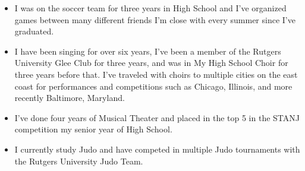 \documentclass[12pt,a4paper,sans]{moderncv}        %
\begin{document}
\begin{itemize}

\item{I was on the soccer team for three years in High School and I've organized games between many different friends I'm close with every summer since I've graduated.}

\vspace{6pt}

\item{I have been singing for over six years, I've been a member of the Rutgers University Glee Club for three years, and was in My High School Choir for three years before that. I've traveled with choirs to multiple cities on the east coast for performances and competitions such as Chicago, Illinois, and more recently Baltimore, Maryland.} 

\vspace{6pt}

\item{I've done four years of Musical Theater and placed in the top 5 in the STANJ competition my senior year of High School.}

\vspace{6pt}

\item{I currently study Judo and have competed in multiple Judo tournaments with the Rutgers University Judo Team.}


\vspace{6pt}

\end{itemize}



\nocite{*}

         
\end{document}
